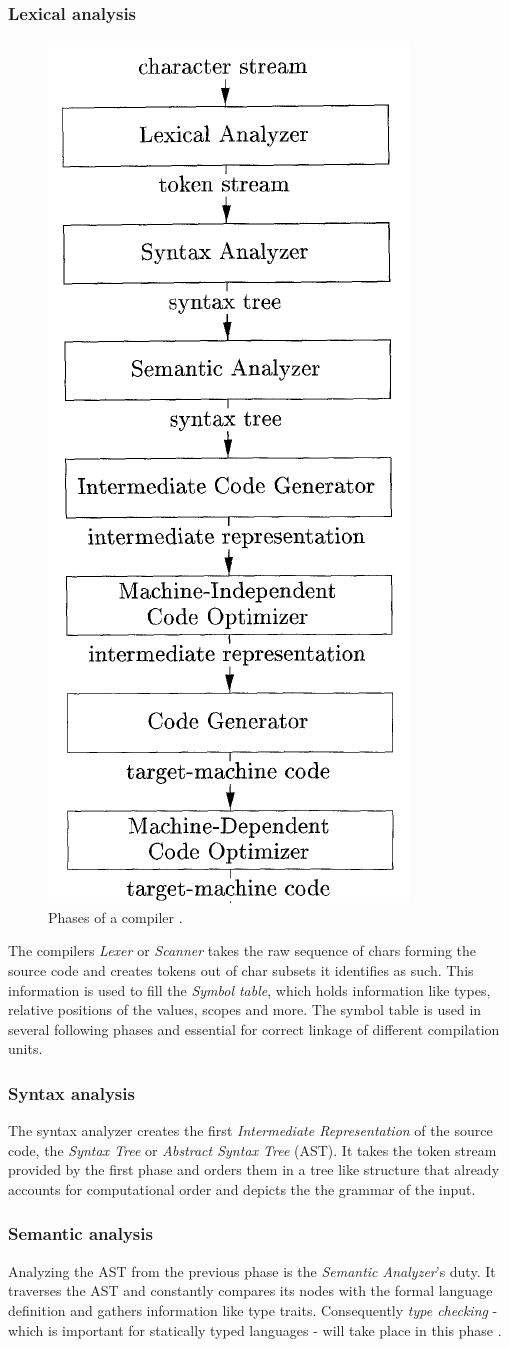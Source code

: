 \subsubsection{Lexical analysis}
\begin{figure}
\vspace{-1cm}
	\begin{center}
		\includegraphics[width=.3\textwidth, height=0.45\textheight]{PICs/compiler_phases}
	\end{center}
	\caption{Phases of a compiler .}\label{compiler_phases}
\end{figure}
The compilers \textit{Lexer} or \textit{Scanner} takes the raw sequence of chars forming the source code and creates tokens out of char subsets it identifies as such. This information is used to fill the \textit{Symbol table}, which holds information like types, relative positions of the values, scopes and more. The symbol table is used in several following phases and essential for correct linkage of different compilation units.
\subsubsection{Syntax analysis}
The syntax analyzer creates the first \textit{Intermediate Representation} of the source code, the \textit{Syntax Tree} or \textit{Abstract Syntax Tree} (AST). It takes the token stream provided by the first phase and orders them in a tree like structure that already accounts for computational order and depicts the the grammar of the input.
\subsubsection{Semantic analysis}
Analyzing the AST from the previous phase is the \textit{Semantic Analyzer}'s duty. It traverses the AST and constantly compares its nodes with the formal language definition and gathers information like type traits. Consequently \textit{type checking} - which is important for statically typed languages - will take place in this phase .

